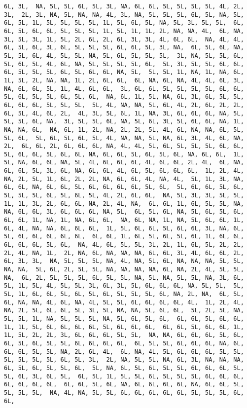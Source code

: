\documentclass[
]{article}
\begin{document}
\begin{verbatim}
6L, 3L,  NA, 5L, 5L, 6L, 5L, 3L, NA, 6L, 6L, 5L, 5L, 5L, 5L, 4L, 2L, 3L,  2L, 3L, NA, 5L, NA, NA, 4L, 3L, NA, 5L, 5L, 5L, 6L, 5L, NA, 5L,  6L, 5L, 1L, 5L, 5L, 5L, 5L, 1L, 5L, 6L, 5L, NA, 5L, 3L, 5L, 5L,  6L, 6L, 5L, 6L, 6L, 5L, 5L, 5L, 1L, 5L, 1L, 1L, 2L, NA, NA, 4L,  6L, NA, 3L, 5L, 3L, 1L, 5L, 2L, 6L, 2L, 6L, 3L, 3L, 4L, 6L, 6L,  NA, 4L, 4L, 6L, 5L, 6L, 3L, 6L, 5L, 5L, 5L, 6L, 6L, 5L, 3L, NA,  6L, 5L, 6L, NA, 5L, 5L, 6L, 4L, 5L, 5L, NA, 5L, 6L, 5L, 5L, 5L,  3L, NA, 5L, 5L, 6L, 5L, 6L, 5L, 4L, 6L, NA, 5L, 5L, 5L, 5L, 6L,  5L, 3L, 5L, 5L, 6L, 6L, 6L, 5L, 5L, 5L, 6L, 5L, 6L, 6L, NA, 5L,  5L, 5L, 1L, NA, 1L, NA, 6L, 1L, 5L, 2L, NA, NA, 1L, 2L, 6L, 6L,  6L, NA, 6L, NA, 4L, 4L, 6L, 3L, NA, 6L, 6L, 5L, 1L, 4L, 6L, 6L,  3L, 6L, 6L, 5L, 5L, 5L, 5L, 6L, 6L, 5L, 6L, 5L, 5L, 6L, 5L, 6L,  NA, 6L, 1L, 5L, NA, 6L, 3L, 6L, 5L, 5L, 6L, 6L, 6L, 5L, 5L, 5L,  5L, 4L, NA, NA, 5L, 6L, 4L, 2L, 6L, 2L, 2L, 6L, 5L, 4L, 6L, 2L,  4L, 3L, 5L, 6L, 1L, NA, 3L, 6L, 6L, 6L, NA, 5L, 5L, 5L, 6L, NA,  3L, 5L, 5L, 6L, NA, 5L, 6L, 3L, 5L, 6L, 6L, NA, 1L, NA, NA, 6L,  NA, 6L, 1L, 2L, NA, 2L, 2L, 5L, 4L, 6L, NA, NA, 6L, 5L, 5L, 6L,  5L, 6L, 5L, 6L, 5L, 4L, NA, NA, 5L, NA, 6L, 3L, 4L, 6L, NA, 2L,  6L, 6L, 2L, 6L, 6L, 6L, NA, 4L, 4L, 5L, 6L, 5L, 5L, 5L, 6L, 6L,  5L, 6L, 6L, 5L, 6L, 6L, NA, 6L, 6L, 5L, 6L, 5L, 6L, NA, 6L, 6L,  1L, 5L, NA, 6L, 6L, NA, 5L, 4L, 6L, 6L, 6L, 4L, 6L, 6L, 2L, 4L,  6L, NA, 6L, 6L, 5L, 3L, 6L, NA, 6L, 6L, 4L, 6L, 5L, 6L, 6L, 6L,  1L, 2L, 4L, NA, 2L, 5L, 1L, 6L, 2L, 2L, NA, 6L, 6L, 4L, NA, 4L,  5L, 1L, 3L, NA, 6L, 6L, NA, 6L, 6L, 5L, 6L, 6L, 6L, 6L, 5L, 6L,  5L, 6L, 6L, 5L, 6L, 5L, 5L, 5L, 6L, 5L, 6L, 5L, 4L, 2L, 6L, 6L,  NA, 5L, 3L, 3L, 5L, 5L, 1L, 1L, 3L, 2L, 6L, 6L, NA, 2L, 4L, NA,  6L, 6L, 1L, 6L, 5L, 5L, NA, NA, 6L, 6L, 3L, 6L, 6L, 6L, NA, 5L,  6L, 5L, 6L, NA, 5L, 6L, 5L, 6L, 6L, 6L, 1L, NA, 1L, NA, 6L, 6L,  NA, 6L, NA, 1L, NA, 5L, 6L, 6L, 1L, 6L, 4L, NA, NA, 6L, 6L, 6L,  1L, 5L, 6L, 6L, 5L, 6L, 6L, 3L, NA, 6L, 5L, 6L, 6L, 6L, 6L, 6L,  6L, 6L, 1L, 6L, 5L, 6L, 5L, 6L, 1L, 6L, 6L, 6L, 6L, 6L, 5L, 6L,  NA, 4L, 6L, 5L, 5L, 3L, 2L, 1L, 6L, 5L, 2L, 2L, 2L, 4L, NA, 1L,  2L, NA, 6L, NA, NA, NA, 6L, 6L, 3L, 4L, 6L, 6L, 2L, 6L, 3L, 3L,  NA, 5L, 5L, 5L, NA, 4L, NA, 5L, 6L, NA, NA, NA, 5L, 5L, NA, NA,  5L, 6L, 2L, 5L, 5L, NA, NA, NA, NA, 6L, NA, 2L, 4L, 5L, 5L, NA,  6L, 2L, 5L, 5L, 5L, 6L, 5L, 5L, NA, 5L, NA, 5L, 5L, NA, 3L, 6L,  5L, 1L, 5L, 4L, 5L, 5L, 3L, 6L, 3L, 5L, 6L, 6L, 6L, NA, 5L, 5L,  5L, 5L, 1L, 6L, 6L, 5L, 6L, 5L, 6L, 5L, 5L, 5L, 6L, NA, 2L, NA,  6L, 5L, 6L, NA, NA, 4L, 6L, NA, 4L, 5L, 5L, 6L, 6L, 6L, 6L, 4L,  1L, 2L, 4L, NA, 2L, 5L, 6L, 6L, 5L, 3L, 5L, NA, NA, 5L, 6L, 6L,  5L, 2L, 5L, NA, 5L, 5L, 1L, NA, 5L, 5L, 5L, NA, 5L, 6L, 5L, 6L,  6L, 6L, 5L, 6L, 6L, 1L, 1L, 5L, 6L, 6L, 6L, 6L, 5L, 6L, 6L, 6L,  6L, 6L, 5L, 6L, 6L, 1L, 1L, 5L, 2L, 2L, 3L, 6L, 6L, 6L, 5L, 5L,  NA, NA, 6L, 6L, 6L, 5L, 6L, 6L, 5L, 6L, 5L, 5L, 6L, 6L, 6L, 6L,  6L, 5L, 5L, 6L, 6L, 6L, NA, 6L, 6L, 6L, 5L, 5L, NA, 2L, 6L, 4L,  6L, NA, 4L, 5L, 6L, 6L, 6L, 5L, 5L, 5L, 5L, 5L, 5L, 6L, 5L, 3L,  2L, NA, 5L, 5L, NA, 6L, 3L, NA, NA, NA, 6L, 5L, 6L, 5L, 5L, 6L,  5L, NA, 6L, 5L, 6L, 5L, 5L, 6L, 6L, 6L, 5L, 5L, 6L, 3L, 6L, 5L,  6L, 5L, 1L, 5L, 5L, 6L, 5L, 5L, 5L, 6L, 6L, 6L, 6L, 6L, 6L, 6L,  6L, 6L, 5L, 6L, NA, 6L, 6L, 6L, 6L, NA, 6L, 6L, 5L, 5L, 5L, 5L,  NA, 4L, NA, 5L, 5L, 6L, 6L, 6L, 6L, 6L, 5L, 5L, 5L, 6L, 6L, 
\end{verbatim}
\end{document}
